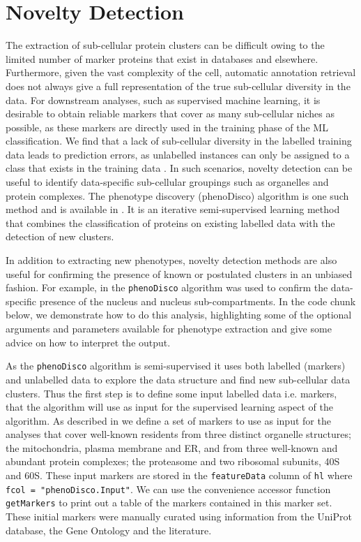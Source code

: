 \section*{Novelty Detection}

The extraction of sub-cellular protein clusters can be difficult owing
to the limited number of marker proteins that exist in databases and
elsewhere. Furthermore, given the vast complexity of the cell,
automatic annotation retrieval does not always give a full
representation of the true sub-cellular diversity in the data. For
downstream analyses, such as supervised machine learning, it is
desirable to obtain reliable markers that cover as many sub-cellular
niches as possible, as these markers are directly used in the training
phase of the ML classification. We find that a lack of sub-cellular
diversity in the labelled training data leads to prediction errors, as
unlabelled instances can only be assigned to a class that exists in
the training data \cite{Breckels:2013}. In such scenarios, novelty
detection can be useful to identify data-specific sub-cellular
groupings such as organelles and protein complexes. The phenotype
discovery (phenoDisco) algorithm \cite{Breckels:2013} is one such method
and is available in . It is an iterative
semi-supervised learning method that combines the classification of
proteins on existing labelled data with the detection of new clusters.

In addition to extracting new phenotypes, novelty detection methods
are also useful for confirming the presence of known or postulated
clusters in an unbiased fashion. For example, in \cite{hyper} the
\texttt{phenoDisco} algorithm was used to confirm the data-specific presence
of the nucleus and nucleus sub-compartments. In the code chunk below,
we demonstrate how to do this analysis, highlighting some of the
optional arguments and parameters available for phenotype extraction
and give some advice on how to interpret the output.

As the \texttt{phenoDisco} algorithm is semi-supervised it uses both labelled
(markers) and unlabelled data to explore the data structure and find
new sub-cellular data clusters. Thus the first step is to define some
input labelled data i.e. markers, that the algorithm will use as input
for the supervised learning aspect of the algorithm. As described in
\cite{hyper} we define a set of markers to use as input for the analyses
that cover well-known residents from three distinct organelle
structures; the mitochondria, plasma membrane and ER, and from three
well-known and abundant protein complexes; the proteasome and two
ribosomal subunits, 40S and 60S.  These input markers are stored in
the \texttt{featureData} column of \texttt{hl} where \texttt{fcol = "phenoDisco.Input"}. We
can use the convenience accessor function \texttt{getMarkers} to print out a
table of the markers contained in this marker set. These initial
markers were manually curated using information from the UniProt
database, the Gene Ontology and the literature. 

